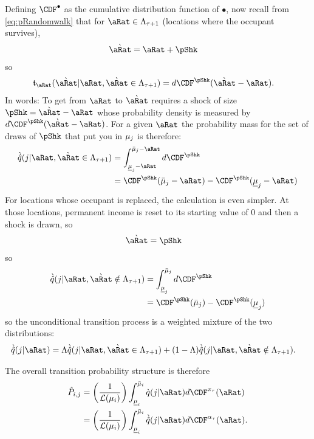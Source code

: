 \documentclass[../BufferStockTheory.tex]{subfiles}\usepackage{ApndxSteadyState}
\begin{document}
  Defining $\CDF^{\bullet}$ as the cumulative distribution function of $\bullet$, now recall from \eqref{eq:pRandomwalk} that for $\point \in \Liv_{\tAbs+1}$ (locations where the occupant survives),
  \begin{align}
    \Nxt{\point} & = \point+\pShk
  \end{align}
  so
  \begin{align}
    \trns_{\point}(\Nxt{\point}|\point, \Nxt{\point} \in \Liv_{\tAbs+1}) &=  d{\CDF^{\pShk}(\Nxt{\point}-\point)}.
  \end{align}
  In words: To get from $\point$ to $\Nxt{\point}$ requires a shock of size $\pShk = \Nxt{\point}-\point$ whose probability density is measured by $d\CDF^{\pShk}(\Nxt{\point}-\point)$.
  For a given $\point$ the probability mass for the set of draws of $\pShk$ that put you in $\SetSub_{\that}$ is therefore:
  \newcommand{\erf}{\text{erf}}
  \begin{align}
    \Nxt{\pDistDscrAprx}(\that|\point,\Nxt{\point}\in\Liv_{\tAbs+1})  &= \int_{\Bot{\SetSub}_{\that}-\point}^{\Top{\SetSub}_{\that}-\point} d{\CDF^{\pShk}}
    \\ & = \CDF^{\pShk}(\Top{\SetSub}_{\that}-\point)-\CDF^{\pShk}(\Bot{\SetSub}_{\that}-\point) \notag
  \end{align}
  For locations whose occupant is replaced, the calculation is even simpler.  At those locations, permanent income is reset to its starting value of 0 and then a shock is drawn, so
  \begin{align}
    \Nxt{\point} &= \pShk
  \end{align}
  so
  \renewcommand{\Die}{(1-\Liv)}
  \begin{align}
    \Nxt{\pDistDscrAprx}(\that|\point,\Nxt{\point}\notin\Liv_{\tAbs+1})  &= \int_{\Bot{\SetSub}_{\that}}^{\Top{\SetSub}_{\that}} d{\CDF^{\pShk}}
    \\ & = \CDF^{\pShk}(\Top{\SetSub}_{\that})-\CDF^{\pShk}(\Bot{\SetSub}_{\that}) \notag
  \end{align}
  so the unconditional transition process is a weighted mixture of the two distributions:
  \begin{align}
    \Nxt{\pDistDscrAprx}(\that|\point)  &= \Liv\Nxt{\pDistDscrAprx}(\that|\point,\Nxt{\point}\in\Liv_{\tAbs+1}) + (1-\Liv)    \Nxt{\pDistDscrAprx}(\that|\point,\Nxt{\point}\notin\Liv_{\tAbs+1}).
  \end{align}
  

  The overall transition probability structure is therefore 
  \begin{align}
    \PTrnsDscr_{\this,\that}& = \left(\frac{1}{\Lebes(\SetSub_{\this})}\right)  \int_{\Bot{\SetSub}_{\this}}^{\Top{\SetSub}_{\this}} \Nxt{\pDistDscr}(\that|\point) d\CDF^{\pDens_{\tAbs}}(\point)
\\ & = \left(\frac{1}{\Lebes(\SetSub_{\this})}\right)  \int_{\Bot{\SetSub}_{\this}}^{\Top{\SetSub}_{\this}} \Nxt{\pDistDscrAprx}(\that|\point) d\CDF^{\pContAprx_{\tAbs}}(\point)                              .
  \end{align}
\end{document}
